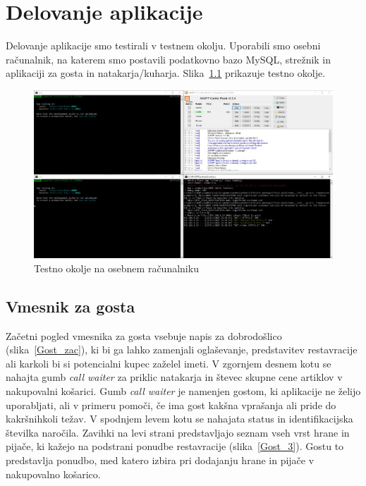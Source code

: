 \documentclass[a4paper, 12pt]{book}
\begin{document}
\chapter {Delovanje aplikacije}
Delovanje aplikacije smo testirali v testnem okolju. Uporabili smo osebni računalnik, na katerem smo postavili podatkovno bazo MySQL, strežnik in aplikaciji za gosta in natakarja/kuharja. Slika~\ref{Program1} prikazuje testno okolje.

\begin{figure}[!htb]
\begin{center}
\includegraphics[width=14cm]{Programi.jpg}
\caption{Testno okolje na osebnem računalniku}
\label{Program1}
\end{center}
\end{figure}


\section{Vmesnik za gosta}
Začetni pogled vmesnika za gosta vsebuje napis za dobrodošlico (slika~\ref{Gost_zac}), ki bi ga lahko zamenjali oglaševanje, predstavitev restavracije ali karkoli bi si potencialni kupec zaželel imeti. V zgornjem desnem kotu se nahajta gumb \textit{call waiter} za priklic natakarja in števec skupne cene artiklov v nakupovalni košarici. Gumb \textit{call waiter} je namenjen gostom, ki aplikacije ne želijo uporabljati, ali v primeru pomoči, če ima gost kakšna vprašanja ali pride do kakršnihkoli težav. V spodnjem levem kotu se nahajata status in identifikacijska številka naročila. 
Zavihki na levi strani predstavljajo seznam vseh vrst hrane in pijače, ki kažejo na podstrani ponudbe restavracije (slika~\ref{Gost_3}). Gostu to predstavlja ponudbo, med katero izbira pri dodajanju hrane in pijače v nakupovalno košarico.
\end{document}
